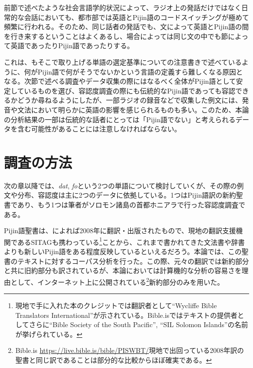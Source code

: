 前節で述べたような社会言語学的状況によって、ラジオ上の発話だけではなく日常的な会話においても、都市部では英語とPijin語のコードスイッチングが極めて頻繁に行われる。そのため、同じ話者の発話でも、文によって英語とPijin語の間を行き来するということはよくあるし、場合によっては同じ文の中でも節によって英語であったりPijin語であったりする。

これは、\cite{dictionary}もそこで取り上げる単語の選定基準についての注意書きで述べているように、何がPijin語で何がそうでないかという言語の定義すら難しくなる原因となる。次節で述べる調査やデータ収集の際にはなるべく全体がPijin語として安定しているものを選び、容認度調査の際にも伝統的なPijin語であっても容認できるかどうか尋ねるようにしたが、一部ラジオの録音などで収集した例文には、発音や文法において明らかに英語の影響を感じられるものも多い。このため、本論の分析結果の一部は伝統的な話者にとっては「Pijin語でない」と考えられるデータを含む可能性があることには注意しなければならない。

\section{調査の方法}\label{sec:howexamined}
次の章以降では、\textit{dat}, \textit{fo}という2つの単語について検討していくが、その際の例文や分布、容認度は主に2つのデータに依拠している。1つはPijin語訳の新約聖書であり、もう1つは筆者がソロモン諸島の首都ホニアラで行った容認度調査である。

Pijin語聖書は、\cite{solomontimes}によれば2008年に翻訳・出版されたもので、現地の翻訳支援機関であるSITAGも携わっている\footnote{
現地で手に入れた本のクレジットでは翻訳者として``Wycliffe Bible Translators International''が示されている。Bible.isではテキストの提供者としてさらに``Bible Society of the South Pacific'', ``SIL Solomon Islands''の名前が挙げられている。}ことから、これまで書かれてきた文法書や辞書よりも新しいPijin語をある程度反映しているといえるだろう。本論では、この聖書のテキストに対するコーパス分析を行った。この際、元々の翻訳では新約部分と共に旧約部分も訳されているが、本論においては計算機的な分析の容易さを理由として、インターネット上に公開されている\footnote{
Bible.is \url{https://live.bible.is/bible/PISWBT/}現地で出回っている2008年訳の聖書と同じ訳であることは部分的な比較からほぼ確実である。}新約部分のみを用いた。

